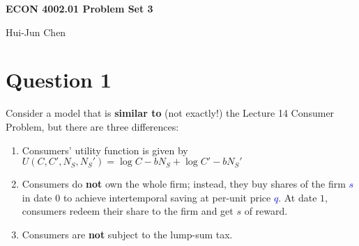 \documentclass[14pt]{extarticle}
\newcommand{\blue}[1]{\textcolor{blue}{#1}}
\newcommand{\showAns}{\setboolean{showAns}{true}}
\begin{document}
\centerline{\huge\bf ECON 4002.01 Problem Set 3}
\smallskip
\centerline{\LARGE Hui-Jun Chen}

\medskip

\showAns

\section*{Question 1}
\label{sec:Question_1}

Consider a model that is \textbf{similar to} (not exactly!) the Lecture 14 Consumer Problem, but there are three differences:

\begin{enumerate}
    \item Consumers' utility function is given by $ U(C, C', N_{S}, N_{S}') = \log C - b N_{S} + \log C' - b N_{S}' $
    \item Consumers do \textbf{not} own the whole firm; instead, they buy shares of the firm \blue{$ s $} in date $ 0 $ to achieve intertemporal saving at per-unit price \blue{$ q $}. At date $ 1 $, consumers redeem their share to the firm and get $ s $ of reward.
    \item Consumers are \textbf{not} subject to the lump-sum tax.
\end{enumerate}
\end{document}
